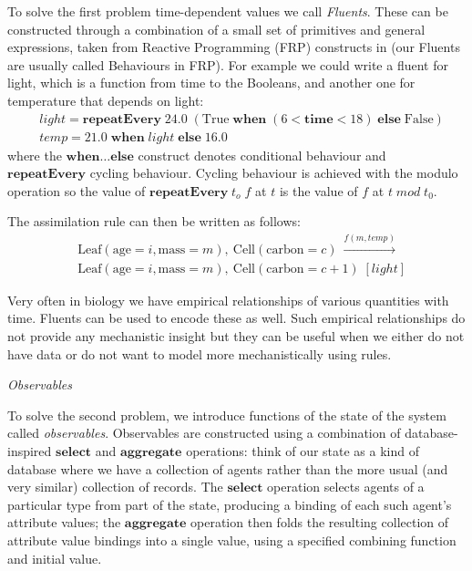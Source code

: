\documentclass[phd]{infthesis}
\begin{document}
To solve the first problem time-dependent values we call \textit{Fluents}. These
can be constructed through a combination of a small set of primitives and
general expressions, taken from Reactive Programming (FRP) constructs in
\citep{wan_functional_2000} (our Fluents are usually called Behaviours in FRP). For
example we could write a fluent for light, which is a function from time to the
Booleans, and another one for temperature that depends on light:
\begin{align*}
& light = \mathbf{repeatEvery} \; 24.0 \; (\mathrm{True} \; \mathbf{when} \; (6 < \mathbf{time} < 18) \; \mathbf{else} \; \mathrm{False}) \\
& temp = 21.0 \; \mathbf{when} \; light \; \mathbf{else} \; 16.0
\end{align*}
where the $\mathbf{when} \dotso \mathbf{else}$ construct denotes conditional
behaviour and $\mathbf{repeatEvery}$ cycling behaviour. Cycling behaviour is
achieved with the modulo operation so the value of $\mathbf{repeatEvery} \; t_o
\; f$ at $t$ is the value of $f$ at $t \; mod \; t_0$.

The assimilation rule can then be written as follows:
\begin{align*}
& \mathrm{Leaf}(\mathrm{age} \!= \!i, \mathrm{mass} \!= \!m), \: \mathrm{Cell}(\mathrm{carbon} \!= \!c) \: \xrightarrow{f(m, temp)}  \\
&\mathrm{Leaf}(\mathrm{age} \!= \!i, \mathrm{mass} \!= \!m), \:
  \mathrm{Cell}(\mathrm{carbon} \!= \!c+1) \; [light ]
\end{align*}

Very often in biology we have empirical relationships of various quantities with
time. Fluents can be used to encode these as well. Such empirical relationships
do not provide any mechanistic insight but they %
can be useful when we either do not have data or do not want to model more
mechanistically using rules.

\textit{Observables}

To solve the second problem, we introduce functions of the state of the system
called \textit{observables}. Observables are constructed using a combination of
database-inspired $\mathbf{select}$ and $\mathbf{aggregate}$ operations: %
think of our state as a kind of database where we have a collection of agents
rather than the more usual (and very similar) collection of records. The $
\mathbf{select}$ operation selects agents of a particular type from %
part of the state, producing a binding of each such agent's attribute values;
the $\mathbf{aggregate}$ operation then folds the resulting collection of
attribute value bindings into a single value, using a specified combining
function and initial value.
\end{document}
